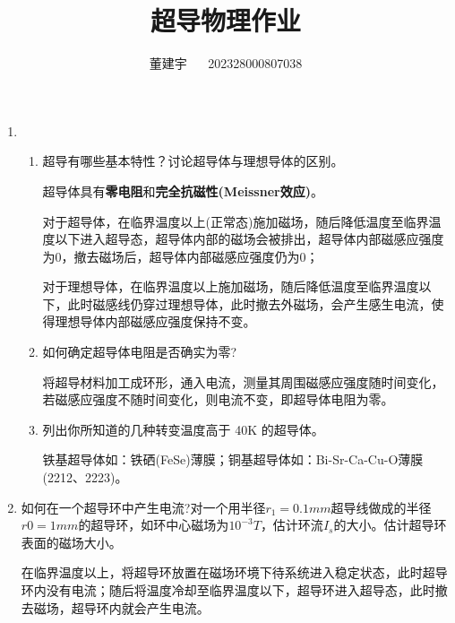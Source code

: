 \documentclass[reqno,a4paper,12pt]{amsart}
\title{超导物理作业}
\author{董建宇 ~~ 202328000807038}
\begin{document}
\maketitle
\titleformat{\section}[hang]{\small}{\thesection}{0.8em}{}{}
\titleformat{\subsection}[hang]{\small}{\thesubsection}{0.8em}{}{}

\begin{enumerate}[1.]
\item 
\begin{enumerate}[(1)]
\item 超导有哪些基本特性？讨论超导体与理想导体的区别。
\begin{tcolorbox}[breakable, colback = black!5!white, colframe = black]
超导体具有\textbf{零电阻}和\textbf{完全抗磁性(Meissner效应)}。

对于超导体，在临界温度以上(正常态)施加磁场，随后降低温度至临界温度以下进入超导态，超导体内部的磁场会被排出，超导体内部磁感应强度为0，撤去磁场后，超导体内部磁感应强度仍为0；

对于理想导体，在临界温度以上施加磁场，随后降低温度至临界温度以下，此时磁感线仍穿过理想导体，此时撤去外磁场，会产生感生电流，使得理想导体内部磁感应强度保持不变。
\end{tcolorbox}

\item 如何确定超导体电阻是否确实为零?
\begin{tcolorbox}[breakable, colback = black!5!white, colframe = black]
将超导材料加工成环形，通入电流，测量其周围磁感应强度随时间变化，若磁感应强度不随时间变化，则电流不变，即超导体电阻为零。
\end{tcolorbox}

\item 列出你所知道的几种转变温度高于 40K 的超导体。
\begin{tcolorbox}[breakable, colback = black!5!white, colframe = black]
铁基超导体如：铁硒(FeSe)薄膜；铜基超导体如：Bi-Sr-Ca-Cu-O薄膜(2212、2223)。
\end{tcolorbox}
\end{enumerate}

\item 如何在一个超导环中产生电流?对一个用半径$r_1=0.1mm$超导线做成的半径$r0=1mm$的超导环，如环中心磁场为$10^{-3}T$，估计环流$I_s$的大小。估计超导环表面的磁场大小。
\begin{tcolorbox}[breakable, colback = black!5!white, colframe = black]
在临界温度以上，将超导环放置在磁场环境下待系统进入稳定状态，此时超导环内没有电流；随后将温度冷却至临界温度以下，超导环进入超导态，此时撤去磁场，超导环内就会产生电流。


\end{tcolorbox}
\end{enumerate}
\end{document}
